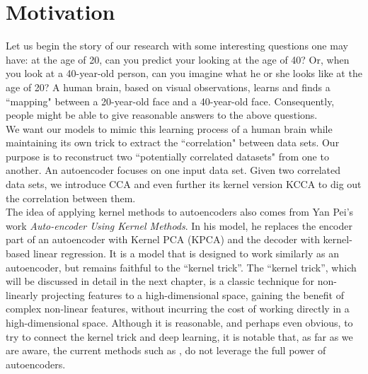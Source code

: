 \documentclass[12pt]{report} %
\begin{document}
\section{Motivation}
Let us begin the story of our research with some interesting questions one may have: at the age of 20, can you predict your looking at the age of 40? Or, when you look at a 40-year-old person, can you imagine what he or she looks like at the age of 20? A human brain, based on visual observations, learns and finds a ``mapping" between a 20-year-old face and a 40-year-old face. Consequently, people might be able to give reasonable answers to the above questions.\\
We want our models to mimic this learning process of a human brain while maintaining its own trick to extract the ``correlation" between data sets. Our purpose is to reconstruct two ``potentially correlated datasets" from one to another. An autoencoder focuses on one input data set. Given two correlated data sets, we introduce CCA and even further its kernel version KCCA to dig out the correlation between them. \\
The idea of applying kernel methods to autoencoders also comes from Yan Pei's work \textit{Auto-encoder Using Kernel Methods}\cite{AUKM}. In his model, he replaces the encoder part of an autoencoder with Kernel PCA (KPCA)\cite{KPCA} and the decoder with kernel-based linear regression. It is a model that is designed to work similarly as an autoencoder, but remains faithful to the ``kernel trick''. The ``kernel trick'', which will be discussed in detail in the next chapter, is a classic technique for non-linearly projecting features to a high-dimensional space, gaining the benefit of complex non-linear features, without incurring the cost of working directly in a high-dimensional space. Although it is reasonable, and perhaps even obvious, to try to connect the kernel trick and deep learning, it is notable that, as far as we are aware, the current methods such as \cite{AUKM}, do not leverage the full power of autoencoders.\\
\end{document}
